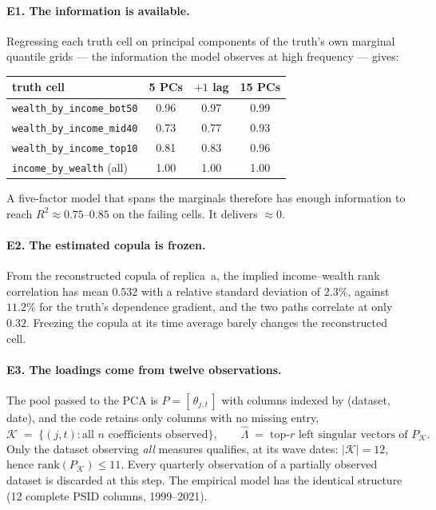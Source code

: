 \documentclass[11pt]{article}
\begin{document}
\paragraph{E1. The information is available.} Regressing each truth cell on
principal components of the truth's own marginal quantile grids --- the
information the model observes at high frequency --- gives:

\begin{center}
\begin{tabular}{lccc}
\toprule
truth cell & 5 PCs & $+1$ lag & 15 PCs \\
\midrule
\texttt{wealth\_by\_income\_bot50} & 0.96 & 0.97 & 0.99 \\
\texttt{wealth\_by\_income\_mid40} & 0.73 & 0.77 & 0.93 \\
\texttt{wealth\_by\_income\_top10} & 0.81 & 0.83 & 0.96 \\
\texttt{income\_by\_wealth} (all)  & 1.00 & 1.00 & 1.00 \\
\bottomrule
\end{tabular}
\end{center}

A five-factor model that spans the marginals therefore has enough information to
reach $R^2 \approx 0.75$--$0.85$ on the failing cells. It delivers $\approx 0$.

\paragraph{E2. The estimated copula is frozen.} From the reconstructed copula of
replica~a, the implied income--wealth rank correlation has mean $0.532$ with a
relative standard deviation of $2.3\%$, against $11.2\%$ for the truth's
dependence gradient, and the two paths correlate at only $0.32$. Freezing the
copula at its time average barely changes the reconstructed cell.

\paragraph{E3. The loadings come from twelve observations.} The pool passed to
the PCA is $P = [\,\theta_{j,t}\,]$ with columns indexed by (dataset, date), and
the code retains only columns with no missing entry,
\begin{equation}
  \mathcal{K} \;=\; \bigl\{ (j,t) : \text{all $n$ coefficients observed} \bigr\},
  \qquad
  \hat\Lambda \;=\; \text{top-$r$ left singular vectors of } P_{\mathcal{K}} .
\end{equation}
Only the dataset observing \emph{all} measures qualifies, at its wave dates:
$|\mathcal{K}| = 12$, hence $\mathrm{rank}(P_\mathcal{K}) \le 11$. Every
quarterly observation of a partially observed dataset is discarded at this step.
The empirical model has the identical structure (12 complete PSID columns,
1999--2021).
\end{document}

